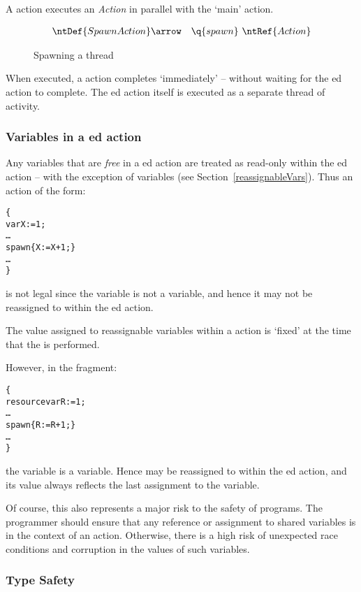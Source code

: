 A  action executes an \emph{Action} in parallel with the `main' action.
\begin{figure}[htbp]
\begin{eqnarray*}
\ntDef{SpawnAction}&\arrow&\q{spawn}\ \ntRef{Action}
\end{eqnarray*}
\caption{Spawning a thread}\label{spawnSyntaxFig}
\end{figure}
When executed, a  action completes `immediately' -- without waiting for the ed action to complete. The ed action itself is executed as a separate thread of activity.

\subsubsection{Variables in a ed action}

Any variables that are \emph{free} in a ed action are treated as read-only within the ed action -- with the exception of  variables (see Section~\vref{reassignableVars}). Thus an action of the form:
\begin{alltt}
\{
  var X := 1;
  \ldots
  spawn \{ X := X+1; \}
  \ldots
\}
\end{alltt}
is not legal since the variable  is not a  variable, and hence it may not be reassigned to within the ed action.

The value assigned to reassignable variables within a  action is `fixed' at the time that the  is performed.

However, in the fragment:
\begin{alltt}
\{
  resource var R := 1;
  \ldots
  spawn \{ R:=R+1; \}
  \ldots
\}
\end{alltt}
the variable  is a  variable. Hence  may be reassigned to within the ed action, and its value always reflects the last assignment to the variable.
\begin{aside}
Of course, this also represents a major risk to the safety of programs. The programmer should ensure that any reference or assignment to shared  variables is in the context of an  action. Otherwise, there is a high risk of unexpected race conditions and corruption in the values of such variables.
\end{aside}

\subsubsection{Type Safety}

